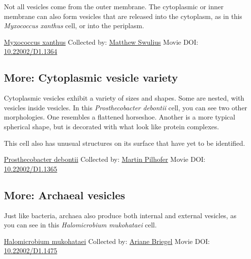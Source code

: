 \documentclass[]{tufte-book}
\begin{document}
Not all vesicles come from the outer membrane. The cytoplasmic or inner membrane can also form vesicles that are released into the cytoplasm, as in this \emph{Myxococcus xanthus} cell, or into the periplasm.



\hypertarget{htmlwidget-1d3e52ccc3e906d8b34a}{}

\label{fig:2-4c}\protect\hyperlink{tree}{Myxococcus xanthus} Collected by: \protect\hyperlink{matthew_swulius}{Matthew Swulius} Movie DOI: \href{https://doi.org/10.22002/D1.1364}{10.22002/D1.1364}

\hypertarget{Cytoplasmic_vesicle_variety}{%
\subsection*{More: Cytoplasmic vesicle variety}\label{Cytoplasmic_vesicle_variety}}

Cytoplasmic vesicles exhibit a variety of sizes and shapes. Some are nested, with vesicles inside vesicles. In this \emph{Prosthecobacter debontii} cell, you can see two other morphologies. One resembles a flattened horseshoe. Another is a more typical spherical shape, but is decorated with what look like protein complexes.

This cell also has unusual structures on its surface that have yet to be identified.



\hypertarget{htmlwidget-ee460b98acc1cd51564c}{}

\label{fig:2-4d}\protect\hyperlink{tree}{Prosthecobacter debontii} Collected by: \protect\hyperlink{martin_pilhofer}{Martin Pilhofer} Movie DOI: \href{https://doi.org/10.22002/D1.1365}{10.22002/D1.1365}

\hypertarget{Archaeal_vesicles}{%
\subsection*{More: Archaeal vesicles}\label{Archaeal_vesicles}}

Just like bacteria, archaea also produce both internal and external vesicles, as you can see in this \emph{Halomicrobium mukohataei} cell.



\hypertarget{htmlwidget-bfd741da44bb9fbac52a}{}

\label{fig:2-4e}\protect\hyperlink{tree}{Halomicrobium mukohataei} Collected by: \protect\hyperlink{ariane_briegel}{Ariane Briegel} Movie DOI: \href{https://doi.org/10.22002/D1.1475}{10.22002/D1.1475}
\end{document}
